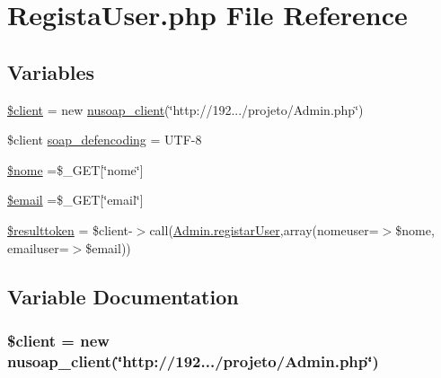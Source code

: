 \hypertarget{_regista_user_8php}{}\section{Regista\+User.\+php File Reference}
\label{_regista_user_8php}
\subsection*{Variables}
\begin{DoxyCompactItemize}
\item 
\hyperlink{_regista_user_8php_ad1405dc1ba2e288764378e79bff7a87d}{\$client} = new \hyperlink{classnusoap__client}{nusoap\+\_\+client}(\char`\"{}http\+://192.../projeto/Admin.\+php\char`\"{})
\item 
\$client \hyperlink{_regista_user_8php_a944cce1b9c1aa5e93c77ace20ce99989}{soap\+\_\+defencoding} = \textquotesingle{}U\+T\+F-\/8\textquotesingle{}
\item 
\hyperlink{_regista_user_8php_ac8c9d9dd5d90fa5854f0cb8397084ebd}{\$nome} =\$\+\_\+\+G\+E\+T\mbox{[}\char`\"{}nome\char`\"{}\mbox{]}
\item 
\hyperlink{_regista_user_8php_ad634f418b20382e2802f80532d76d3cd}{\$email} =\$\+\_\+\+G\+E\+T\mbox{[}\char`\"{}email\char`\"{}\mbox{]}
\item 
\hyperlink{_regista_user_8php_af03fe45fe254e6434fe3819dfa8c4b34}{\$resulttoken} = \$client-\/$>$call(\textquotesingle{}\hyperlink{class_admin_a793f81c7f4842a47d71b49984456f0f0}{Admin.\+registar\+User}\textquotesingle{},array(\textquotesingle{}nomeuser\textquotesingle{}=$>$\$nome, \textquotesingle{}emailuser\textquotesingle{}=$>$\$email))
\end{DoxyCompactItemize}


\subsection{Variable Documentation}
\hypertarget{_regista_user_8php_ad1405dc1ba2e288764378e79bff7a87d}{}
\subsubsection[{\$client}]{\setlength{\rightskip}{0pt plus 5cm}\$client = new {\bf nusoap\+\_\+client}(\char`\"{}http\+://192.../projeto/Admin.\+php\char`\"{})}\label{_regista_user_8php_ad1405dc1ba2e288764378e79bff7a87d}
\hypertarget{_regista_user_8php_ad634f418b20382e2802f80532d76d3cd}{}

